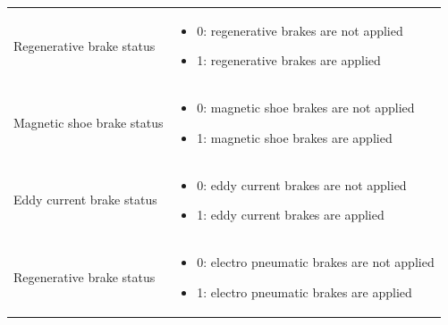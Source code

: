 \documentclass[nocc]{template/openetcs_report}
\begin{document}
\begin{longtable}{|l|l|}
\begin{minipage}[t]{0.5\linewidth}
					\end{minipage} \\
				\hline
				\begin{minipage}[t]{0.5\linewidth} Regenerative brake status	\end{minipage} 
				&	\begin{minipage}[t]{0.5\linewidth}
						\begin{itemize}
							\item 0: regenerative brakes are not applied
							\item 1: regenerative brakes are applied
						\end{itemize}
					\end{minipage} \\
				\hline
				\begin{minipage}[t]{0.5\linewidth} Magnetic shoe brake status	\end{minipage} 
				&	\begin{minipage}[t]{0.5\linewidth}
						\begin{itemize}
							\item 0: magnetic shoe brakes are not applied
							\item 1: magnetic shoe brakes are applied
						\end{itemize}
					\end{minipage} \\
				\hline
				\begin{minipage}[t]{0.5\linewidth} Eddy current brake status	\end{minipage} 
				&	\begin{minipage}[t]{0.5\linewidth}
						\begin{itemize}
							\item 0: eddy current brakes are not applied
							\item 1: eddy current brakes are applied
						\end{itemize}
					\end{minipage} \\
				\hline
				\begin{minipage}[t]{0.5\linewidth} Regenerative brake status	\end{minipage} 
				&	\begin{minipage}[t]{0.5\linewidth}
						\begin{itemize}
							\item 0: electro pneumatic brakes are not applied
							\item 1: electro pneumatic brakes are applied
						\end{itemize}

\end{minipage}
\end{longtable}
\end{document}
